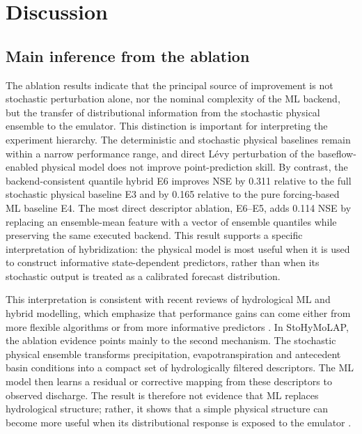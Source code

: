 \documentclass[a4paper,fleqn]{cas-sc}
\begin{document}

\section{Discussion}\label{sec:discussion}

\subsection{Main inference from the ablation}
\label{subsec:discussion-main-inference}

The ablation results indicate that the principal source of improvement
is not stochastic perturbation alone, nor the nominal complexity of the
ML backend, but the transfer of distributional information from the
stochastic physical ensemble to the emulator. This distinction is
important for interpreting the experiment hierarchy. The deterministic
and stochastic physical baselines remain within a narrow performance
range, and direct L\'{e}vy perturbation of the baseflow-enabled physical
model does not improve point-prediction skill. By contrast, the
backend-consistent quantile hybrid E6 improves NSE by 0.311 relative to
the full stochastic physical baseline E3 and by 0.165 relative to the
pure forcing-based ML baseline E4. The most direct descriptor ablation,
E6--E5, adds 0.114 NSE by replacing an ensemble-mean feature with a
vector of ensemble quantiles while preserving the same executed
backend. This result supports a specific interpretation of hybridization:
the physical model is most useful when it is used to construct
informative state-dependent predictors, rather than when its stochastic
output is treated as a calibrated forecast distribution.

This interpretation is consistent with recent reviews of hydrological
ML and hybrid modelling, which emphasize that performance gains can
come either from more flexible algorithms or from more informative
predictors \citep{papacharalampous2022review,zhong2023developing}. In
StoHyMoLAP, the ablation evidence points mainly to the second mechanism.
The stochastic physical ensemble transforms precipitation,
evapotranspiration and antecedent basin conditions into a compact set of
hydrologically filtered descriptors. The ML model then learns a residual
or corrective mapping from these descriptors to observed discharge. The
result is therefore not evidence that ML replaces hydrological
structure; rather, it shows that a simple physical structure can become
more useful when its distributional response is exposed to the emulator
\citep{mekonnen2015hybrid,houenafa2025hybridization}.
\end{document}
